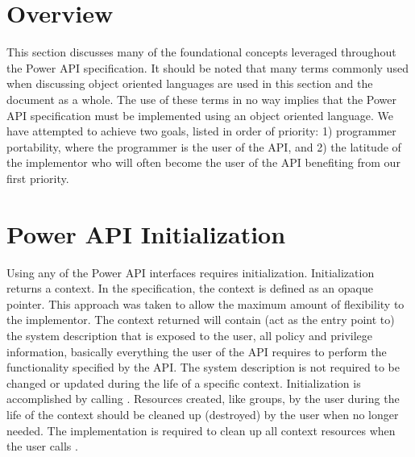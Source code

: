 
\section{Overview}
This section discusses many of the foundational concepts leveraged throughout the Power API specification.
It should be noted that many terms commonly used when discussing object oriented languages are used in this section and the document as a whole.
The use of these terms in no way implies that the Power API specification must be implemented using an object oriented language.
We have attempted to achieve two goals, listed in order of priority: 1) programmer portability, where the programmer is the user of the API, and 2) the latitude of the implementor who will often become the user of the API benefiting from our first priority. 

\section{Power API Initialization}\label{sec:PowerAPIInit}


Using any of the Power API interfaces requires initialization. 
Initialization returns a context.
In the specification, the context is defined as an opaque pointer.
This approach was taken to allow the maximum amount of flexibility to the implementor.
The context returned will contain (act as the entry point to) the system description that is exposed to the user, all policy and privilege information, basically everything the user of the API requires to perform the functionality specified by the API.
The system description is not required to be changed or updated during the life of a specific context.
Initialization is accomplished by calling .
Resources created, like groups, by the user during the life of the context should be cleaned up (destroyed) by the user when no longer needed. 
The implementation is required to clean up all context resources when the user calls .

